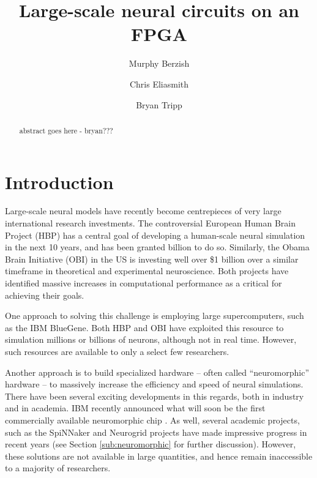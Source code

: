 \documentclass[english]{article}
\begin{document}
\lstset{basicstyle=\footnotesize}

\title{Large-scale neural circuits on an FPGA}

\author[1]{Murphy Berzish}
\author[1,2,3]{Chris Eliasmith}
\author[1,2]{Bryan Tripp}
\maketitle

\begin{abstract}
abstract goes here - bryan???
\end{abstract}

\section{Introduction}

Large-scale neural models have recently become centrepieces of very large international research investments. The controversial European Human Brain Project (HBP) has a central goal of developing a human-scale neural simulation in the next 10 years, and has been granted  billion to do so.  Similarly, the Obama Brain Initiative (OBI) in the US is investing well over \$1 billion over a similar timeframe in theoretical and experimental neuroscience. Both projects have identified massive increases in computational performance as a critical for achieving their goals.

One approach to solving this challenge is employing large supercomputers, such as the IBM BlueGene.  Both HBP and OBI have exploited this resource to simulation millions or billions of neurons, although not in real time.  However, such resources are available to only a select few researchers.

Another approach is to build specialized hardware -- often called ``neuromorphic'' hardware -- to massively increase the efficiency and speed of neural simulations.  There have been several exciting developments in this regards, both in industry and in academia.  IBM recently announced what will soon be the first commercially available neuromorphic chip \cite{Merolla2014}. As well, several academic projects, such as the SpiNNaker \cite{Khan2008} and Neurogrid \cite{Choudhary2012} projects have made impressive progress in recent years (see Section \ref{sub:neuromorphic} for further discussion).  However, these solutions are not available in large quantities, and hence remain inaccessible to a majority of researchers.
\end{document}
